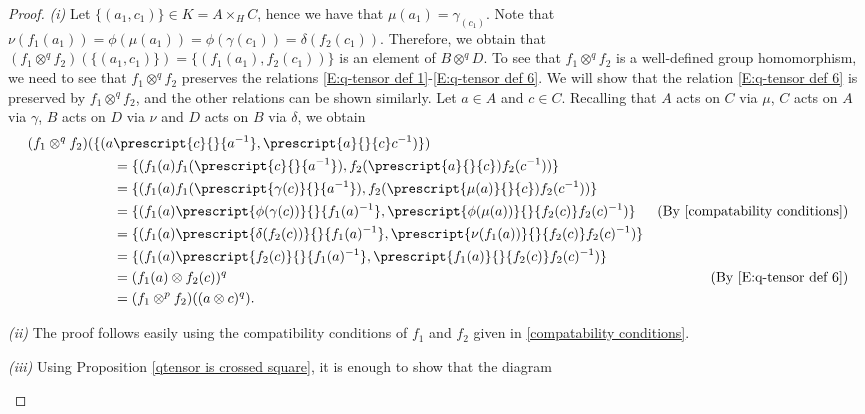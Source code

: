 \documentclass[12pt]{elsarticle}
\newtheorem*{main corollary*}{Main Corollary}
\theoremstyle{definition}
\newcommand{\tens}{
	\otimes^q}
\newcommand{\ptens}{
	\otimes^p}
\begin{document}
 \begin{proof}
 
        \textit{(i)} Let $\{(a_1,c_1)\} \in K=A \times_H C$, hence we have that ${\mu(a_1)=\gamma_(c_1)}$. Note that $\nu(f_1(a_1))=\phi(\mu(a_1))=\phi(\gamma(c_1))=\delta(f_2(c_1))$. Therefore, we obtain that ${(f_1 \tens f_2) (\{(a_1,c_1)\})=\{(f_1(a_1),f_2(c_1))\}}$ is an element of $B \tens D$. To see that $f_1 \tens f_2$ is a well-defined group homomorphism, we need to see that $f_1 \tens f_2$ preserves the relations \eqref{E:q-tensor def 1}-\eqref{E:q-tensor def 6}. We will show that the relation \eqref{E:q-tensor def 6} is preserved by $f_1 \tens f_2$, and the other relations can be shown similarly. Let $a \in A$ and $c \in C$. Recalling that $A$ acts on $C$ via $\mu$, $C$ acts on $A$ via $\gamma$, $B$ acts on $D$ via $\nu$ and $D$ acts on $B$ via $\delta$, we obtain 
        \begin{align*}
            (f_1 \tens f_2)(\{(a &\prescript{c}{}{a^{-1}},\prescript{a}{}{c}c^{-1})\}) \\
            &= \{(f_1(a)f_1(\prescript{c}{}{a^{-1}}),f_2(\prescript{a}{}{c})f_2(c^{-1}))\} \\
            &=\{(f_1(a)f_1(\prescript{\gamma(c)}{}{a^{-1}}),f_2(\prescript{\mu(a)}{}{c})f_2(c^{-1}))\} \\
            &=\{(f_1(a)\prescript{\phi(\gamma(c))}{}{f_1(a)^{-1}},\prescript{\phi(\mu(a))}{}{f_2(c)}f_2(c)^{-1})\} &\mbox{(By } \eqref{compatability conditions})\\
          &=\{(f_1(a)\prescript{\delta(f_2(c))}{}{f_1(a)^{-1}},\prescript{\nu(f_1(a))}{}{f_2(c)}f_2(c)^{-1})\} \\
            &=\{(f_1(a)\prescript{f_2(c)}{}{f_1(a)^{-1}},\prescript{f_1(a)}{}{f_2(c)}f_2(c)^{-1})\} \\
            &=(f_1(a) \otimes f_2(c))^q & \mbox{(By } \eqref{E:q-tensor def 6})\\
            & = (f_1 \ptens f_2)((a \otimes c)^q).
        \end{align*}
        \par\textit{(ii)} The proof follows easily using the compatibility conditions of $f_1$ and $f_2$ given in \eqref{compatability conditions}.
        \par\textit{(iii)} Using Proposition \ref{qtensor is crossed square}, it is enough to show that the diagram
        \begin{center}
\end{center}
\end{proof}
\end{document}
